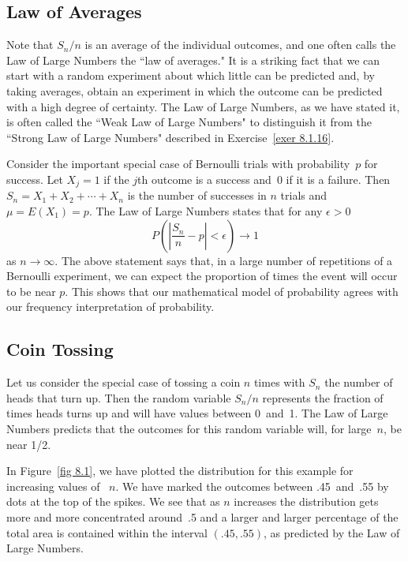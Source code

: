 \subsection*{Law of Averages}
Note that $S_n/n$ is an average of the individual outcomes, and one often
calls the Law of Large Numbers the ``law of averages." It is a striking fact
that we can start with a random experiment about which little can be predicted
and, by taking averages, obtain an experiment in which the outcome can be
predicted with a high degree of certainty.  The Law of Large Numbers, as we
have stated it, is often called the ``Weak Law of Large Numbers" to
distinguish it from the ``Strong Law of Large Numbers" described in
Exercise~\ref{exer 8.1.16}.

Consider the important special case of Bernoulli trials with probability~$p$
for success.  Let $X_j = 1$ if the $j$th outcome is a success and~0 if it is a
failure.  Then $S_n = X_1 + X_2 +\cdots+ X_n$ is the number of successes in $n$
trials and $\mu = E(X_1) = p$.  The Law of Large Numbers states that for any
$\epsilon > 0$
$$
P\left( \left| \frac {S_n}n - p \right| < \epsilon \right) \to 1
$$
as $n \rightarrow \infty$.  The above statement says that, in a large number of repetitions
of a Bernoulli experiment, we can expect the proportion of times the event will
occur to be near $p$.  This shows that our mathematical model of probability
agrees with our frequency interpretation of probability.  

\subsection*{Coin Tossing}
Let us consider the special case of tossing a coin $n$ times with $S_n$ the
number of heads that turn up.  Then the random variable $S_n/n$ represents the
fraction of times heads turns up and will have values between 0~and~1.  The Law
of Large Numbers predicts that the outcomes for this random variable will, for
large~$n$, be near 1/2.

In Figure~\ref{fig 8.1}, we have plotted the distribution for this example for increasing values of
~$n$. We have marked the outcomes between .45~and~.55 by dots at the top of the
spikes.  We see that as
$n$ increases the distribution gets more and more concentrated around~.5 and a larger
and larger percentage of the total area is contained within the interval
$(.45,.55)$, as predicted by the Law of Large Numbers.



